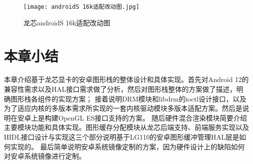 \begin{figure}
  \centering
  \texttt{[image: androidS 16k适配改动图.jpg]}
  \caption{龙芯androidS 16k适配改动图}
  \label{fig:androidS 16k适配改动图}
\end{figure}


\section{本章小结}
本章介绍基于龙芯显卡的安卓图形栈的整体设计和具体实现。首先对Android 12的兼容性需求以及HAL接口需求做了分析，然后对图形栈整体的方案做了描述，明确图形栈各组件的实现方案；
接着说明DRM模块和libdrm的ioctl设计接口，以及为了适应内核的多版本需求所实现的一套内核驱动模块多版本适配方案。然后是说明在安卓上是构建OpenGL ES接口支持的方案。
随后硬件混合渲染模块简要介绍主要模块功能和具体实现。图形缓存分配模块从龙芯后端支持、前端服务实现以及HIDL接口设计与实现这三个部分说明基于LG110的安卓图形缓冲管理HAL层是如何实现的。
最后简单说明安卓系统镜像定制的方案，因为硬件设计上的缺陷如何对安卓系统镜像进行定制。






